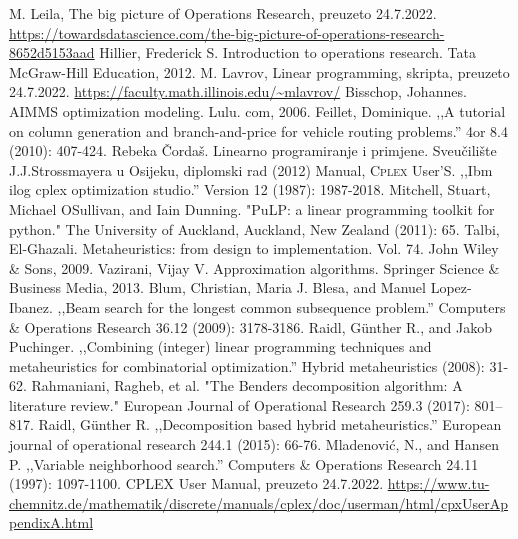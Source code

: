 \documentclass[b5paper, utf8, 11pt, colorlinks]{book}
\theoremstyle{definition}
\begin{document}
\begin{thebibliography}{widest entry}
	 M. Leila, The big picture of Operations Research, preuzeto 24.7.2022. \url{https://towardsdatascience.com/the-big-picture-of-operations-research-8652d5153aad}
	 Hillier, Frederick S. Introduction to operations research. Tata McGraw-Hill Education, 2012.
	 M. Lavrov, Linear programming, skripta, preuzeto 24.7.2022. \url{https://faculty.math.illinois.edu/~mlavrov/}
	   Bisschop, Johannes. AIMMS optimization modeling. Lulu. com, 2006.
	   Feillet, Dominique. ,,A tutorial on column generation and branch-and-price for vehicle routing problems.'' 4or 8.4 (2010): 407-424.
	    Rebeka Čordaš. Linearno programiranje i primjene. Sveu\v cili\v ste J.J.Strossmayera u Osijeku, diplomski rad (2012)
	     Manual, \textsc{Cplex} User’S. ,,Ibm ilog cplex optimization studio.'' Version 12 (1987): 1987-2018.
	   Mitchell, Stuart, Michael OSullivan, and Iain Dunning. "PuLP: a linear programming toolkit for python." The University of Auckland, Auckland, New Zealand (2011): 65.
	      Talbi, El-Ghazali. Metaheuristics: from design to implementation. Vol. 74. John Wiley \& Sons, 2009.
	       Vazirani, Vijay V. Approximation algorithms. Springer Science \& Business Media, 2013.
	        Blum, Christian, Maria J. Blesa, and Manuel Lopez-Ibanez. ,,Beam search for the longest common subsequence problem.'' Computers \& Operations Research 36.12 (2009): 3178-3186.
	      Raidl, Günther R., and Jakob Puchinger. ,,Combining (integer) linear programming techniques and metaheuristics for combinatorial optimization.'' Hybrid metaheuristics (2008): 31-62.
	           Rahmaniani, Ragheb, et al. "The Benders decomposition algorithm: A literature review." European Journal of Operational Research 259.3 (2017): 801--817.
	         Raidl, Günther R. ,,Decomposition based hybrid metaheuristics.'' European journal of operational research 244.1 (2015): 66-76.
	        Mladenović, N., and  Hansen P. ,,Variable neighborhood search.'' Computers \& Operations Research 24.11 (1997): 1097-1100.
	       CPLEX User Manual, preuzeto 24.7.2022. \url{https://www.tu-chemnitz.de/mathematik/discrete/manuals/cplex/doc/userman/html/cpxUserAppendixA.html}

\end{thebibliography}
\end{document}
